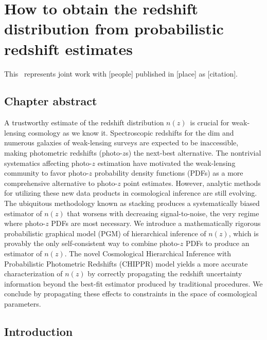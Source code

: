\renewcommand{\chapid}{chippr}

\newcommand{\Chippr}{\project{CHIPPR}}

\newcommand{\nz}{$n(z)$}
\newcommand{\Nz}{$N(z)$}
\newcommand{\stack}{$\hat{N}(z)$}
\newcommand{\ndphi}{\ensuremath{\vec{\phi}}}%
\newcommand{\data}{\ensuremath{\vec{d}}}%

\chapter{How to obtain the redshift distribution from probabilistic redshift estimates}

This \paper\ represents joint work with [people] published in [place] as [citation].

\section{Chapter abstract}

A trustworthy estimate of the redshift distribution \nz\ is crucial for weak-lensing cosmology as we know it.
Spectroscopic redshifts for the dim and numerous galaxies of weak-lensing surveys are expected to be inaccessible, making photometric redshifts (photo-$z$s) the next-best alternative.
The nontrivial systematics affecting photo-$z$ estimation have motivated the weak-lensing community to favor photo-$z$ probability density functions (PDFs) as a more comprehensive alternative to photo-$z$ point estimates.
However, analytic methods for utilizing these new data products in cosmological inference are still evolving.
The ubiquitous methodology known as stacking produces a systematically biased estimator of $n(z)$ that worsens with decreasing signal-to-noise, the very regime where photo-$z$ PDFs are most necessary.
We introduce a mathematically rigorous probabilistic graphical model (PGM) of hierarchical inference of $n(z)$, which is provably the only self-consistent way to combine photo-$z$ PDFs to produce an estimator of $n(z)$.
The novel Cosmological Hierarchical Inference with Probabilistic Photometric Redshifts (CHIPPR) model yields a more accurate characterization of $n(z)$ by correctly propagating the redshift uncertainty information beyond the best-fit estimator produced by traditional procedures.
We conclude by propagating these effects to constraints in the space of cosmological parameters.

\section{Introduction}

